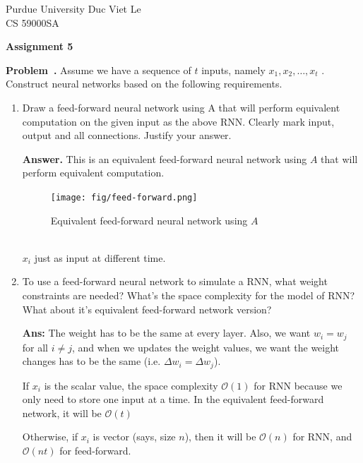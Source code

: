 \documentclass{article}
\newcommand{\dspace}{\baselineskip 16pt}
\newcommand{\sspace}{\baselineskip 14pt}
\newcounter{problem}[section]
\newenvironment{problem}[1][]{\refstepcounter{problem}\par\medskip
   \noindent \textbf{Problem~\theproblem. #1} \rmfamily}{\medskip}
\newenvironment{proof}{\begin{mdframed}\textbf{Ans:}}{ \end{mdframed}}
\begin{document}
\sspace
\noindent
Purdue University \hfill Duc Viet Le\\
CS 59000SA        \hfill 
\dspace
\begin{center}
{\bf Assignment 5}
\end{center}
\vspace{.2in}
\begin{problem} Assume we have a sequence of $t$ inputs, namely $x_1 , x_2 , \dots , x_t$ . Construct neural networks
based on the following requirements. 
\begin{enumerate}
    \item  Draw a feed-forward neural network using A that will perform equivalent computation on the given input as the above RNN. Clearly mark input, output and all connections. Justify your answer.

    \textbf{Answer. }
    This is an equivalent feed-forward neural network using $A$ that will perform equivalent computation. 
    \begin{figure}[h!]
        \centering
        \texttt{[image: fig/feed-forward.png]}
        \caption{Equivalent feed-forward neural network using $A$}
    \end{figure}
    \\
    $x_i$ just as input at different time.
    \item To use a feed-forward neural network to simulate a RNN, what weight constraints are needed? What's the space complexity for the model of RNN? What about it's equivalent feed-forward network version?
    \begin{proof}
        The weight has to be the same at every layer. Also,  we want $w_i = w_j$ for all $i\neq j$, and when we updates the weight values, we want the weight changes has to be the same (i.e. $\Delta w_i = \Delta w_j$).

        If $x_i$ is the scalar value, the space complexity $\mathcal O(1)$ for RNN because we only need to store one input at a time. In the equivalent feed-forward network, it will be $\mathcal O(t)$ 

        Otherwise, if $x_i$ is vector (says, size $n$), then it will be $\mathcal O(n)$ for RNN, and $\mathcal O(nt)$ for feed-forward. 
    \end{proof}
\end{enumerate}
\end{problem}
\end{document}
